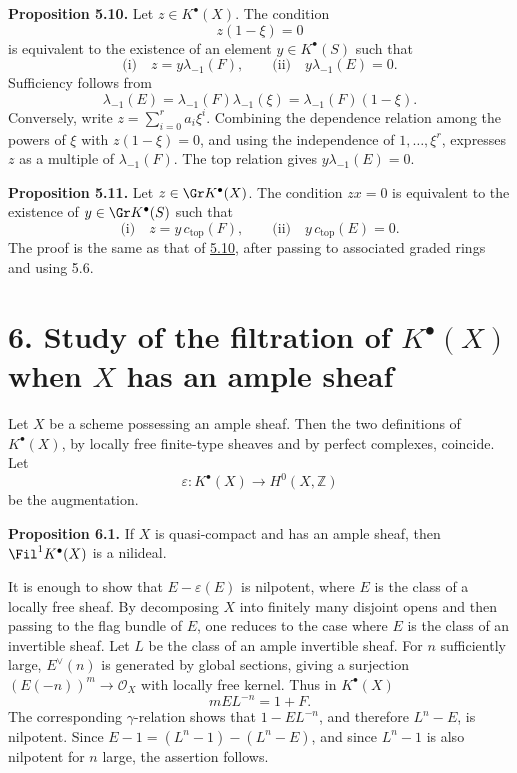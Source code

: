 \textbf{Proposition 5.10.} Let \(z\in K^\bullet(X)\). The condition
\[
  z(1-\xi)=0
\]
is equivalent to the existence of an element \(y\in K^\bullet(S)\) such that
\[
  \text{(i)}\quad z=y\lambda_{-1}(F),
  \qquad
  \text{(ii)}\quad y\lambda_{-1}(E)=0.
\]
Sufficiency follows from
\[
  \lambda_{-1}(E)=\lambda_{-1}(F)\lambda_{-1}(\xi)=\lambda_{-1}(F)(1-\xi).
\]
Conversely, write \(z=\sum_{i=0}^r a_i\xi^i\). Combining the dependence relation among the powers of \(\xi\) with \(z(1-\xi)=0\), and using the independence of \(1,\ldots,\xi^r\), expresses \(z\) as a multiple of \(\lambda_{-1}(F)\). The top relation gives \(y\lambda_{-1}(E)=0\).

\textbf{Proposition 5.11.} Let \(z\in \Gr K^\bullet(X)\). The condition \(zx=0\) is equivalent to the existence of \(y\in \Gr K^\bullet(S)\) such that
\[
  \text{(i)}\quad z=y\,c_{\mathrm{top}}(F),
  \qquad
  \text{(ii)}\quad y\,c_{\mathrm{top}}(E)=0.
\]
The proof is the same as that of \hyperlink{sga6.e06.prop.5-10}{5.10}, after passing to associated graded rings and using 5.6.

\section*{6. Study of the filtration of \(K^\bullet(X)\) when \(X\) has an ample sheaf}

Let \(X\) be a scheme possessing an ample sheaf. Then the two definitions of \(K^\bullet(X)\), by locally free finite-type sheaves and by perfect complexes, coincide. Let
\[
  \varepsilon:K^\bullet(X)\longrightarrow H^0(X,\mathbb Z)
\]
be the augmentation.

\textbf{Proposition 6.1.} If \(X\) is quasi-compact and has an ample sheaf, then \(\Fil^1 K^\bullet(X)\) is a nilideal.

It is enough to show that \(E-\varepsilon(E)\) is nilpotent, where \(E\) is the class of a locally free sheaf. By decomposing \(X\) into finitely many disjoint opens and then passing to the flag bundle of \(E\), one reduces to the case where \(E\) is the class of an invertible sheaf. Let \(L\) be the class of an ample invertible sheaf. For \(n\) sufficiently large, \(E^\vee(n)\) is generated by global sections, giving a surjection \((E(-n))^m\to \mathcal O_X\) with locally free kernel. Thus in \(K^\bullet(X)\)
\[
  mEL^{-n}=1+F.
\]
The corresponding \(\gamma\)-relation shows that \(1-EL^{-n}\), and therefore \(L^n-E\), is nilpotent. Since \(E-1=(L^n-1)-(L^n-E)\), and since \(L^n-1\) is also nilpotent for \(n\) large, the assertion follows.


